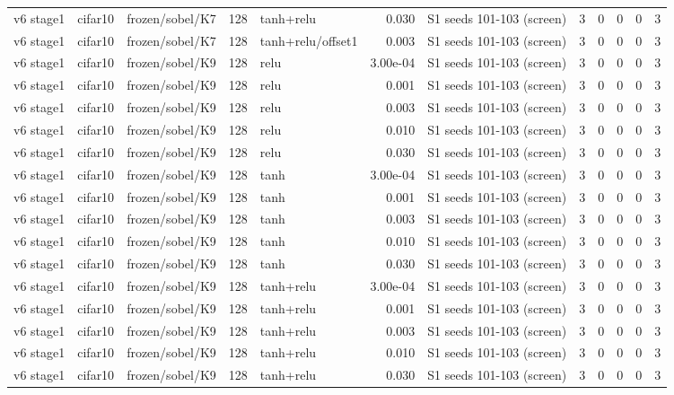 \begin{table}[htbp]
{\begin{tabular}{@{}lllrlrlrrrrr@{}}
v6 stage1 & cifar10 & frozen/sobel/K7 & 128 & tanh+relu & 0.030 & S1 seeds 101-103 (screen) & 3 & 0 & 0 & 0 & 3 \\
v6 stage1 & cifar10 & frozen/sobel/K7 & 128 & tanh+relu/offset1 & 0.003 & S1 seeds 101-103 (screen) & 3 & 0 & 0 & 0 & 3 \\
v6 stage1 & cifar10 & frozen/sobel/K9 & 128 & relu & 3.00e-04 & S1 seeds 101-103 (screen) & 3 & 0 & 0 & 0 & 3 \\
v6 stage1 & cifar10 & frozen/sobel/K9 & 128 & relu & 0.001 & S1 seeds 101-103 (screen) & 3 & 0 & 0 & 0 & 3 \\
v6 stage1 & cifar10 & frozen/sobel/K9 & 128 & relu & 0.003 & S1 seeds 101-103 (screen) & 3 & 0 & 0 & 0 & 3 \\
v6 stage1 & cifar10 & frozen/sobel/K9 & 128 & relu & 0.010 & S1 seeds 101-103 (screen) & 3 & 0 & 0 & 0 & 3 \\
v6 stage1 & cifar10 & frozen/sobel/K9 & 128 & relu & 0.030 & S1 seeds 101-103 (screen) & 3 & 0 & 0 & 0 & 3 \\
v6 stage1 & cifar10 & frozen/sobel/K9 & 128 & tanh & 3.00e-04 & S1 seeds 101-103 (screen) & 3 & 0 & 0 & 0 & 3 \\
v6 stage1 & cifar10 & frozen/sobel/K9 & 128 & tanh & 0.001 & S1 seeds 101-103 (screen) & 3 & 0 & 0 & 0 & 3 \\
v6 stage1 & cifar10 & frozen/sobel/K9 & 128 & tanh & 0.003 & S1 seeds 101-103 (screen) & 3 & 0 & 0 & 0 & 3 \\
v6 stage1 & cifar10 & frozen/sobel/K9 & 128 & tanh & 0.010 & S1 seeds 101-103 (screen) & 3 & 0 & 0 & 0 & 3 \\
v6 stage1 & cifar10 & frozen/sobel/K9 & 128 & tanh & 0.030 & S1 seeds 101-103 (screen) & 3 & 0 & 0 & 0 & 3 \\
v6 stage1 & cifar10 & frozen/sobel/K9 & 128 & tanh+relu & 3.00e-04 & S1 seeds 101-103 (screen) & 3 & 0 & 0 & 0 & 3 \\
v6 stage1 & cifar10 & frozen/sobel/K9 & 128 & tanh+relu & 0.001 & S1 seeds 101-103 (screen) & 3 & 0 & 0 & 0 & 3 \\
v6 stage1 & cifar10 & frozen/sobel/K9 & 128 & tanh+relu & 0.003 & S1 seeds 101-103 (screen) & 3 & 0 & 0 & 0 & 3 \\
v6 stage1 & cifar10 & frozen/sobel/K9 & 128 & tanh+relu & 0.010 & S1 seeds 101-103 (screen) & 3 & 0 & 0 & 0 & 3 \\
v6 stage1 & cifar10 & frozen/sobel/K9 & 128 & tanh+relu & 0.030 & S1 seeds 101-103 (screen) & 3 & 0 & 0 & 0 & 3 \\

\end{tabular}}
\end{table}
